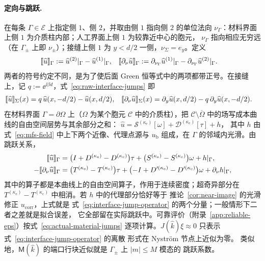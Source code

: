 \paragraph{定向与跳跃.}
在每条 $\Gamma\in\mathscr E$ 上指定侧 $1$、侧 $2$，并取由侧 $1$ 指向侧 $2$ 的单位法向
$\nu_\Gamma$：材料界面上侧 $1$ 为介质柱内部；人工界面上侧 $1$ 为较靠近中心的胞元，
$\nu_\Gamma$ 指向相应无穷远（在 $\Gamma_\pm$ 上即 $\nu_\pm$）；接缝上侧 $1$ 为
$y<d/2$ 一侧，$\nu_\Sigma=e_y$。定义
\begin{align}
  \llbracket \widehat u\rrbracket_\Gamma
  &:=\widehat u^{(2)}|_\Gamma-\widehat u^{(1)}|_\Gamma,
  &\llbracket \partial_\nu\widehat u\rrbracket_\Gamma
  &:=\partial_{\nu_\Gamma}\widehat u^{(1)}|_\Gamma
    -\partial_{\nu_\Gamma}\widehat u^{(2)}|_\Gamma.
  \label{eq:raw-interface-jumps}
\end{align}
两者的符号约定不同，是为了使后面 Green 恒等式中的两项都带正号。在接缝上，记
$q:=\ee^{\ii\beta d}$，式~\eqref{eq:raw-interface-jumps} 即
\begin{align}
  \llbracket \widehat u\rrbracket_\Sigma(x)&=q\,\widehat u(x,-d/2)-\widehat u(x,d/2),
  &\llbracket \partial_\nu\widehat u\rrbracket_\Sigma(x)
  &=\partial_y\widehat u(x,d/2)-q\,\partial_y\widehat u(x,-d/2).
  \label{eq:seam-jumps}
\end{align}
在材料界面 $\Gamma=\partial\Omega$ 上（$\Omega$ 为某个胞元 $\mathcal C$ 中的介质柱），把
$\mathcal C\setminus\overline\Omega$ 中的场写成本曲线的自由空间层势与其余部分之和：
$\widehat u=\mathcal S^{(\kappa_{\mathrm e})}[\omega]+\mathcal D^{(\kappa_{\mathrm e})}[\tau]+h$，
其中 $h$ 由式~\eqref{eq:mfs-field} 中上下两个近像、代理点源与 $u_{\mathrm b}$ 组成，在
$\Gamma$ 的邻域内光滑。由跳跃关系，
\begin{align}
  \llbracket \widehat u\rrbracket_\Gamma
  &=\bigl(I+D^{(\kappa_{\mathrm e})}-D^{(\kappa_{\mathrm c})}\bigr)\tau
    +\bigl(S^{(\kappa_{\mathrm e})}-S^{(\kappa_{\mathrm c})}\bigr)\omega+h|_\Gamma,
  \notag\\
  -\llbracket \partial_\nu\widehat u\rrbracket_\Gamma
  &=\bigl(T^{(\kappa_{\mathrm e})}-T^{(\kappa_{\mathrm c})}\bigr)\tau
    +\bigl(-I+D'^{(\kappa_{\mathrm e})}-D'^{(\kappa_{\mathrm c})}\bigr)\omega
    +\partial_\nu h|_\Gamma,
  \label{eq:actual-material-jumps}
\end{align}
其中的算子都是本曲线上的自由空间算子，作用于连续密度；超奇异部分在
$T^{(\kappa_{\mathrm e})}-T^{(\kappa_{\mathrm c})}$ 中相消。若 $h$ 中的代理部分恰好等于
推论~\ref{cor:near-image} 的光滑修正 $u_{\mathrm{corr}}$，上式就是
式~\eqref{eq:interface-jump-operator} 的两个分量；一般情形下二者之差就是拟合误差，
它全部留在实际跳跃中。可靠评价（附录~\ref{app:reliable-eps}）按式~\eqref{eq:actual-material-jumps}
逐项计算。$J(\widehat k)\xi\approx0$ 只表示式~\eqref{eq:interface-jump-operator} 的离散
形式在 Nystr\"om 节点上近似为零。
类似地，$\mathsf M(\widehat k)$ 的端口行块近似就是 $\Gamma_\pm$ 上 $|m|\leq M$ 模态的
跳跃系数。


